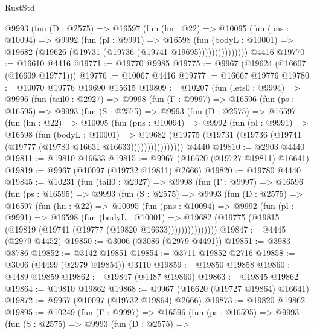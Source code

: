 \begin{lexlean}{RustStd}
\begin{coremodule}
{\begin{coremodule}
{{{{{{{{{{{{{{{{{{{{{{{{{{{{{{{{{{{{{{{{{{{{{{{{{{{{{{{{{{{{{{{{{{{{{{{{{{{{{{              @9993
                (fun (D : @2575) =>
                @16597
                  (fun (hn : @22) =>
                  @10095
                    (fun (pns : @10094) =>
                    @9992
                      (fun (pl : @9991) =>
                      @16598
                        (fun (bodyL : @10001) =>
                        @19682 (@19626 (@19731 (@19736 (@19741 @19695)))))))))))))))
    @4416
@19770 := @16610 @4416
@19771 := @19770 @9985
@19775 := @9967 (@19624 (@16607 (@16609 @19771)))
@19776 := @10067 @4416
@19777 := @16667 @19776
@19780 := @10070 @19776 @19690 @15615
@19809 := @10207
    (fun (lets0 : @9994) =>
    @9996
      (fun (tail0 : @2927) =>
      @9998
        (fun (Γ : @9997) =>
        @16596
          (fun (ps : @16595) =>
          @9993
            (fun (S : @2575) =>
            @9993
              (fun (D : @2575) =>
              @16597
                (fun (hn : @22) =>
                @10095
                  (fun (pns : @10094) =>
                  @9992
                    (fun (pl : @9991) =>
                    @16598
                      (fun (bodyL : @10001) =>
                      @19682
                        (@19775
                          (@19731 (@19736 (@19741 (@19777 (@19780 @16631 @16633))))))))))))))))
    @4440
@19810 := @2903 @4440
@19811 := @19810 @16633
@19815 := @9967 (@16620 (@19727 @19811) @16641)
@19819 := @9967 (@10097 (@19732 @19811) @2666)
@19820 := @19780 @4440
@19845 := @10231
    (fun (tail0 : @2927) =>
    @9998
      (fun (Γ : @9997) =>
      @16596
        (fun (ps : @16595) =>
        @9993
          (fun (S : @2575) =>
          @9993
            (fun (D : @2575) =>
            @16597
              (fun (hn : @22) =>
              @10095
                (fun (pns : @10094) =>
                @9992
                  (fun (pl : @9991) =>
                  @16598
                    (fun (bodyL : @10001) =>
                    @19682 (@19775 (@19815 (@19819 (@19741 (@19777 (@19820 @16633)))))))))))))))
@19847 := @4445 (@2979 @4452)
@19850 := @3006 (@3086 (@2979 @4491))
@19851 := @3983 @8786
@19852 := @3142 @19851
@19854 := @3711 @19852 @2716
@19858 := @3006 (@4499 (@2979 @19854)) @3110
@19859 := @19850 @19858
@19860 := @4489 @19859
@19862 := @19847 (@4487 @19860)
@19863 := @19845 @19862
@19864 := @19810 @19862
@19868 := @9967 (@16620 (@19727 @19864) @16641)
@19872 := @9967 (@10097 (@19732 @19864) @2666)
@19873 := @19820 @19862
@19895 := @10249
    (fun (Γ : @9997) =>
    @16596
      (fun (ps : @16595) =>
      @9993
        (fun (S : @2575) =>
        @9993
          (fun (D : @2575) =>
}}}}}}}}}}}}}}}}}}}}}}}}}}}}}}}}}}}}}}}}}}}}}}}}}}}}}}}}}}}}}}}}}}}}}}}}}}}}}}
\end{coremodule}}
\end{coremodule}
\end{lexlean}
